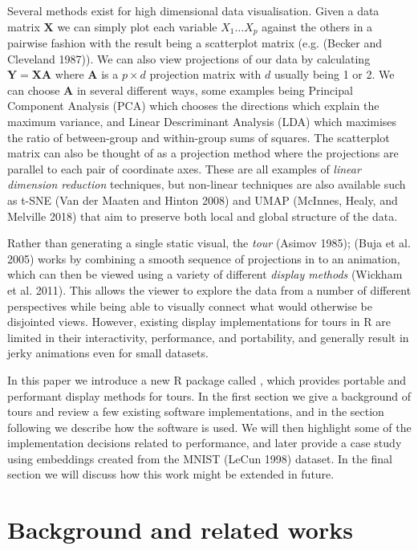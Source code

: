 Several methods exist for high dimensional data visualisation. Given a data matrix \(\mathbf X\) we can simply plot each variable \(X_1 \dots X_p\) against the others in a pairwise fashion with the result being a scatterplot matrix (e.g. (Becker and Cleveland 1987)). We can also view projections of our data by calculating \(\mathbf Y = \mathbf X \mathbf A\) where \(\mathbf A\) is a \(p \times d\) projection matrix with \(d\) usually being 1 or 2. We can choose \(\mathbf A\) in several different ways, some examples being Principal Component Analysis (PCA) which chooses the directions which explain the maximum variance, and Linear Descriminant Analysis (LDA) which maximises the ratio of between-group and within-group sums of squares. The scatterplot matrix can also be thought of as a projection method where the projections are parallel to each pair of coordinate axes. These are all examples of \emph{linear dimension reduction} techniques, but non-linear techniques are also available such as t-SNE (Van der Maaten and Hinton 2008) and UMAP (McInnes, Healy, and Melville 2018) that aim to preserve both local and global structure of the data.

Rather than generating a single static visual, the \emph{tour} (Asimov 1985); (Buja et al. 2005) works by combining a smooth sequence of projections in to an animation, which can then be viewed using a variety of different \emph{display methods} (Wickham et al. 2011). This allows the viewer to explore the data from a number of different perspectives while being able to visually connect what would otherwise be disjointed views. However, existing display implementations for tours in R are limited in their interactivity, performance, and portability, and generally result in jerky animations even for small datasets.

In this paper we introduce a new R package called , which provides portable and performant display methods for tours. In the first section we give a background of tours and review a few existing software implementations, and in the section following we describe how the software is used. We will then highlight some of the implementation decisions related to performance, and later provide a case study using embeddings created from the MNIST (LeCun 1998) dataset. In the final section we will discuss how this work might be extended in future.

\hypertarget{background-and-related-works}{%
\section{Background and related works}\label{background-and-related-works}}

